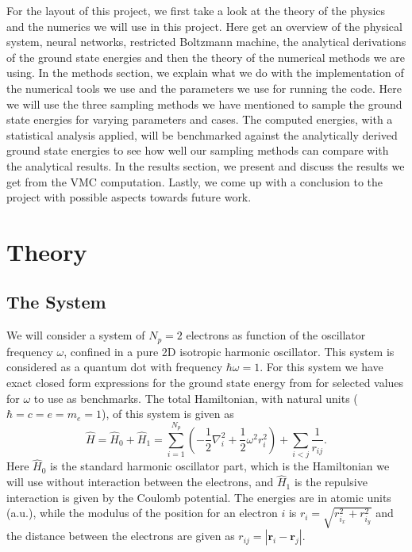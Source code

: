 \documentclass[12pt,a4paper,english]{article}
\begin{document}
For the layout of this project, we first take a look at the theory of the physics and the numerics we will use in this project. Here get an overview of the physical system, neural networks, restricted Boltzmann machine, the analytical derivations of the ground state energies and then the theory of the numerical methods we are using. In the methods section, we explain what we do with the implementation of the numerical tools we use and the parameters we use for running the code. Here we will use the three sampling methods we have mentioned to sample the ground state energies for varying parameters and cases. The computed energies, with a statistical analysis applied, will be benchmarked against the analytically derived ground state energies to see how well our sampling methods can compare with the analytical results. In the results section, we present and discuss the results we get from the VMC computation. Lastly, we come up with a conclusion to the project with possible aspects towards future work.

\section{Theory}
\label{sect:Theory}
\subsection{The System}
\label{subsect:System}
We will consider a system of $N_p=2$ electrons as function of the oscillator frequency $\omega$, confined in a pure 2D isotropic harmonic oscillator. This system is considered as a quantum dot with frequency $\hbar\omega=1$. For this system we have exact closed form expressions for the ground state energy from \citet{taut1993two} for selected values for $\omega$ to use as benchmarks. The total Hamiltonian, with natural units ($\hbar=c=e=m_e=1$), of this system is given as 
\begin{equation}
\label{eq:Hamlitonian}
\hat{H}=\hat{H}_0+\hat{H}_1=\sum_{i=1}^{N_p}\left(-\frac{1}{2}\nabla^2_i + \frac{1}{2}\omega^2r_i^2\right) + \sum_{i<j}\frac{1}{r_{ij}}.
\end{equation}
Here $\hat{H}_0$ is the standard harmonic oscillator part, which is the Hamiltonian we will use without interaction between the electrons, and $\hat{H}_1$ is the repulsive interaction is given by the Coulomb potential. The energies are in atomic units (a.u.), while the modulus of the position for an electron $i$ is $r_i=\sqrt{r^2_{i_x}+r^2_{i_y}}$ and the distance between the electrons are given as $r_{ij}=|\textbf{r}_i-\textbf{r}_j|$.
\end{document}
